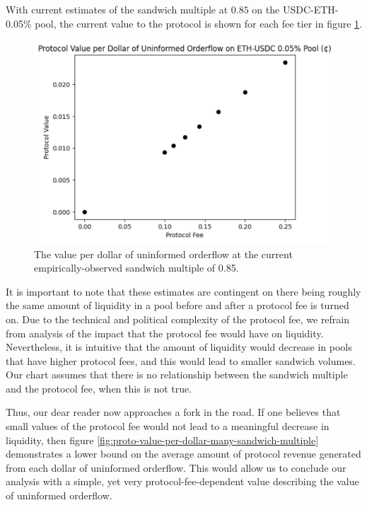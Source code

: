     With current estimates of the sandwich multiple at $0.85$ on the USDC-ETH-0.05\% pool, the current value to the protocol is shown for each fee tier in figure \ref{fig:proto-value-per-dollar-current}.

    \begin{figure}[h]
        \label{fig:proto-value-per-dollar-current}
        \centering
        \includegraphics[scale=.43]{figs/protocol-value-vs-fee-current.png}
        \caption{The value per dollar of uninformed orderflow at the current empirically-observed sandwich multiple of 0.85.}
    \end{figure}

    It is important to note that these estimates are contingent on there being roughly the same amount of liquidity in a pool before and after a protocol fee is turned on. Due to the technical and political complexity of the protocol fee, we refrain from analysis of the impact that the protocol fee would have on liquidity. Nevertheless, it is intuitive that the amount of liquidity would decrease in pools that have higher protocol fees, and this would lead to smaller sandwich volumes. Our chart assumes that there is no relationship between the sandwich multiple and the protocol fee, when this is not true. 

    Thus, our dear reader now approaches a fork in the road. If one believes that small values of the protocol fee would not lead to a meaningful decrease in liquidity, then figure \ref{fig:proto-value-per-dollar-many-sandwich-multiple} demonstrates a lower bound on the average amount of protocol revenue generated from each dollar of uninformed orderflow. This would allow us to conclude our analysis with a simple, yet very protocol-fee-dependent value describing the value of uninformed orderflow.

